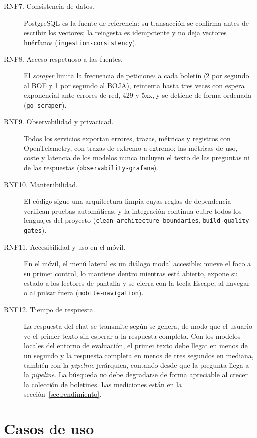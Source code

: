 {\begin{description}
  \item[RNF7. Consistencia de datos.] PostgreSQL es la fuente de referencia: su transacción se confirma antes de escribir los vectores; la reingesta es idempotente y no deja vectores huérfanos (\texttt{ingestion-consistency}).
  \item[RNF8. Acceso respetuoso a las fuentes.] El \emph{scraper} limita la frecuencia de peticiones a cada boletín (2 por segundo al BOE y 1 por segundo al BOJA), reintenta hasta tres veces con espera exponencial ante errores de red, 429 y 5xx, y se detiene de forma ordenada (\texttt{go-scraper}).
  \item[RNF9. Observabilidad y privacidad.] Todos los servicios exportan errores, trazas, métricas y registros con OpenTelemetry, con trazas de extremo a extremo; las métricas de uso, coste y latencia de los modelos nunca incluyen el texto de las preguntas ni de las respuestas (\texttt{observability-grafana}).
  \item[RNF10. Mantenibilidad.] El código sigue una arquitectura limpia cuyas reglas de dependencia verifican pruebas automáticas, y la integración continua cubre todos los lenguajes del proyecto (\texttt{clean-architecture-boundaries}, \texttt{build-quality-gates}).
  \item[RNF11. Accesibilidad y uso en el móvil.] En el móvil, el menú lateral es un diálogo modal accesible: mueve el foco a su primer control, lo mantiene dentro mientras está abierto, expone su estado a los lectores de pantalla y se cierra con la tecla Escape, al navegar o al pulsar fuera (\texttt{mobile-navigation}).
  \item[RNF12. Tiempo de respuesta.] La respuesta del chat se transmite según se genera, de modo que el usuario ve el primer texto sin esperar a la respuesta completa. Con los modelos locales del entorno de evaluación, el primer texto debe llegar en menos de un segundo y la respuesta completa en menos de tres segundos en mediana, también con la \emph{pipeline} jerárquica, contando desde que la pregunta llega a la \emph{pipeline}. La búsqueda no debe degradarse de forma apreciable al crecer la colección de boletines. Las mediciones están en la sección~\ref{sec:rendimiento}.
\end{description}
\par}

\section{Casos de uso}
\label{sec:cu-detalle}

